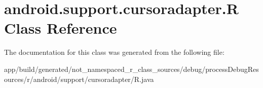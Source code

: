 \hypertarget{classandroid_1_1support_1_1cursoradapter_1_1_r}{}\section{android.\+support.\+cursoradapter.\+R Class Reference}
\label{classandroid_1_1support_1_1cursoradapter_1_1_r}


The documentation for this class was generated from the following file\+:\begin{DoxyCompactItemize}
\item 
app/build/generated/not\+\_\+namespaced\+\_\+r\+\_\+class\+\_\+sources/debug/process\+Debug\+Resources/r/android/support/cursoradapter/R.\+java\end{DoxyCompactItemize}
